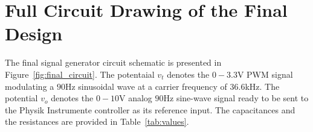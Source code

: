 %

%

\section{Full Circuit Drawing of the Final Design}
\label{sec:fulldesign}

The final signal generator circuit schematic is presented in
Figure~\ref{fig:final_circuit}. The potentaial $v_t$ denotes the
$0-3.3$\unit{\volt} PWM signal modulating a $90$\unit{\hertz} sinusoidal wave at
a carrier frequency of $36.6$\unit{\kilo\hertz}. The potential $v_o$ denotes the
$0-10$\unit{\volt} analog $90$\unit{\hertz} sine-wave signal ready to be sent to
the Physik Instrumente controller as its reference input. The capacitances and
the resistances are provided in Table~\ref{tab:values}.


